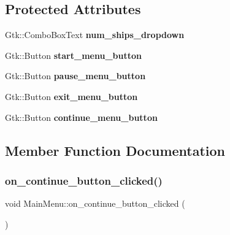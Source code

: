 \subsection*{Protected Attributes}
\begin{DoxyCompactItemize}
\item 
\mbox{\label{classMainMenu_aea4360612bdac04a913cb1d57abcbdf4}} 
Gtk\+::\+Combo\+Box\+Text {\bfseries num\+\_\+ships\+\_\+dropdown}
\item 
\mbox{\label{classMainMenu_affb7e8692845bf2037e19dc8b8a9ecdd}} 
Gtk\+::\+Button {\bfseries start\+\_\+menu\+\_\+button}
\item 
\mbox{\label{classMainMenu_ab1e4fd578eaee5d9a4bcd5c498584591}} 
Gtk\+::\+Button {\bfseries pause\+\_\+menu\+\_\+button}
\item 
\mbox{\label{classMainMenu_a3b919514d14da2a4a85fa05f5bacb330}} 
Gtk\+::\+Button {\bfseries exit\+\_\+menu\+\_\+button}
\item 
\mbox{\label{classMainMenu_a8058818dbdaca12ceec082e1bd6ec35d}} 
Gtk\+::\+Button {\bfseries continue\+\_\+menu\+\_\+button}
\end{DoxyCompactItemize}


\subsection{Member Function Documentation}
\mbox{\label{classMainMenu_ae4449104fee56ee7576bd8d3d3545016}} 
\subsubsection{\texorpdfstring{on\_continue\_button\_clicked()}{on\_continue\_button\_clicked()}}
{\footnotesize\ttfamily void Main\+Menu\+::on\+\_\+continue\+\_\+button\+\_\+clicked (\begin{DoxyParamCaption}{ }\end{DoxyParamCaption})\hspace{0.3cm}{\ttfamily [protected]}}

